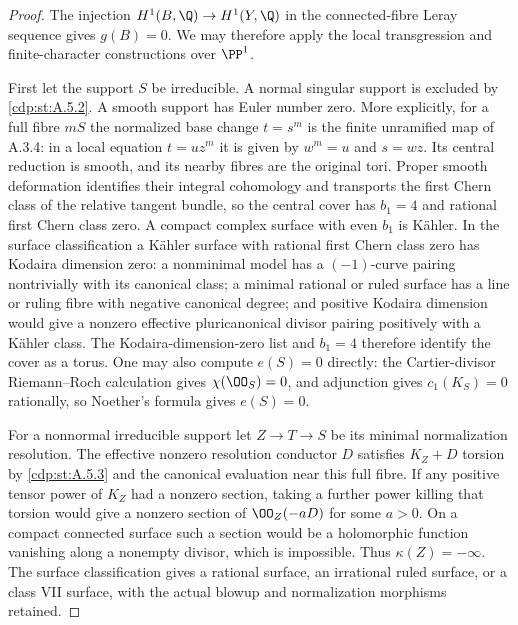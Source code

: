 \begin{proof}
The injection $H^1(B,\Q)\to H^1(Y,\Q)$ in the connected-fibre
Leray sequence gives $g(B)=0$. We may therefore apply the local
transgression and finite-character constructions over $\PP^1$.

First let the support $S$ be irreducible. A normal singular
support is excluded by \ref{cdp:st:A.5.2}. A smooth support has Euler number
zero. More explicitly, for a full fibre $mS$ the normalized base
change $t=s^m$ is the finite unramified map of A.3.4: in a local
equation $t=uz^m$ it is given by $w^m=u$ and $s=wz$.
Its central reduction is smooth, and its nearby fibres are the
original tori. Proper smooth deformation identifies their
integral cohomology and transports the first Chern class of
the relative tangent bundle, so the central cover has $b_1=4$
and rational first Chern class zero. A compact complex surface
with even $b_1$ is K\"ahler. In the surface classification a
K\"ahler surface with rational first Chern class zero has
Kodaira dimension zero: a nonminimal model has a $(-1)$-curve
pairing nontrivially with its canonical class; a minimal
rational or ruled surface has a line or ruling fibre with
negative canonical degree; and positive Kodaira dimension
would give a nonzero
effective pluricanonical divisor pairing positively with a
K\"ahler class. The Kodaira-dimension-zero list and $b_1=4$
therefore identify the cover as a torus. One may also compute
$e(S)=0$ directly: the
Cartier-divisor Riemann--Roch calculation gives
$\chi(\OO_S)=0$, and adjunction gives $c_1(K_S)=0$ rationally,
so Noether's formula gives $e(S)=0$.

For a nonnormal irreducible support let $Z\to T\to S$ be its
minimal normalization resolution. The effective nonzero
resolution conductor $D$ satisfies $K_Z+D$ torsion by \ref{cdp:st:A.5.3}
and the canonical evaluation near this full fibre. If any
positive tensor power of $K_Z$ had a nonzero section, taking
a further power killing that torsion would give a nonzero
section of $\OO_Z(-aD)$ for some $a>0$. On a compact connected
surface such a section would be a holomorphic function
vanishing along a nonempty divisor, which is impossible.
Thus $\kappa(Z)=-\infty$. The surface classification gives a
rational surface, an irrational ruled surface, or a class VII
surface, with the actual blowup and normalization morphisms
retained.


\end{proof}
